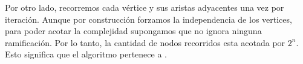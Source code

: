 Por otro lado, recorremos cada vértice y sus aristas adyacentes una vez por iteración. Aunque por construcción forzamos la independencia de los vertices, para poder acotar la complejidad supongamos que no ignora ninguna ramificación. Por lo tanto, la cantidad de nodos recorridos esta acotada por $2^n$. Esto significa que el algoritmo pertenece a .
